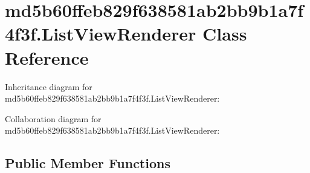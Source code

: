 \hypertarget{classmd5b60ffeb829f638581ab2bb9b1a7f4f3f_1_1_list_view_renderer}{}\section{md5b60ffeb829f638581ab2bb9b1a7f4f3f.\+List\+View\+Renderer Class Reference}
\label{classmd5b60ffeb829f638581ab2bb9b1a7f4f3f_1_1_list_view_renderer}


Inheritance diagram for md5b60ffeb829f638581ab2bb9b1a7f4f3f.\+List\+View\+Renderer\+:


Collaboration diagram for md5b60ffeb829f638581ab2bb9b1a7f4f3f.\+List\+View\+Renderer\+:
\subsection*{Public Member Functions}
